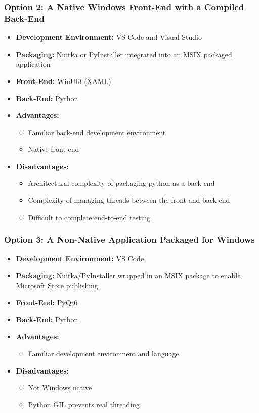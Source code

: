 \subsubsection{Option 2: A Native Windows Front-End with a Compiled Back-End}
\begin{itemize}
    \item \textbf{Development Environment:} VS Code and Visual Studio
    \item \textbf{Packaging:} Nuitka or PyInstaller integrated into an MSIX packaged application
    \item \textbf{Front-End:} WinUI3 (XAML)
    \item \textbf{Back-End:} Python
    \item \textbf{Advantages:}
    \begin{itemize}
        \item Familiar back-end development environment
        \item Native front-end
    \end{itemize}
    \item \textbf{Disadvantages:}
    \begin{itemize}
        \item Architectural complexity of packaging python as a back-end
        \item Complexity of managing threads between the front and back-end
        \item Difficult to complete end-to-end testing
    \end{itemize}
\end{itemize}

\subsubsection{Option 3: A Non-Native Application Packaged for Windows}
\begin{itemize}
    \item \textbf{Development Environment:} VS Code
    \item \textbf{Packaging:} Nuitka/PyInstaller wrapped in an MSIX package to enable Microsoft Store publishing.
    \item \textbf{Front-End:} PyQt6
    \item \textbf{Back-End:} Python
    \item \textbf{Advantages:}
    \begin{itemize}
        \item Familiar development environment and language
    \end{itemize}
    \item \textbf{Disadvantages:}
    \begin{itemize}
        \item Not Windows native
        \item Python GIL prevents real threading
    \end{itemize}
\end{itemize}

